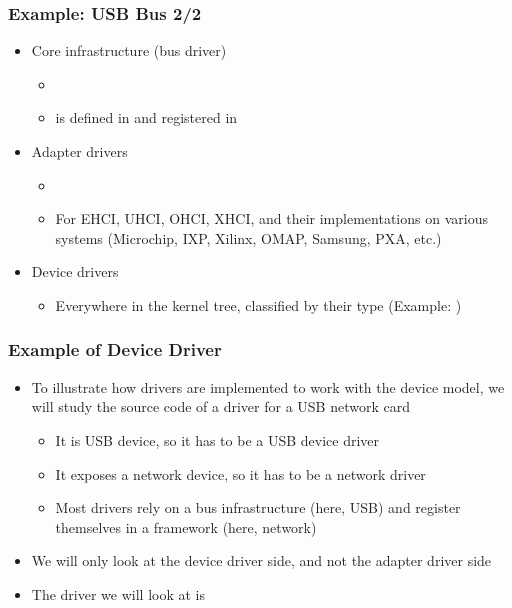 \begin{frame}
  \frametitle{Example: USB Bus 2/2}
  \begin{itemize}
  \item Core infrastructure (bus driver)
    \begin{itemize}
    \item {}
    \item {} is defined in
       and registered in
    \end{itemize}
  \item Adapter drivers
    \begin{itemize}
    \item {}
    \item For EHCI, UHCI, OHCI, XHCI, and their implementations on
      various systems (Microchip, IXP, Xilinx, OMAP, Samsung, PXA, etc.)
    \end{itemize}
  \item Device drivers
    \begin{itemize}
    \item Everywhere in the kernel tree, classified by their type
    (Example: )
    \end{itemize}
  \end{itemize}
\end{frame}

\begin{frame}
  \frametitle{Example of Device Driver}
  \begin{itemize}
  \item To illustrate how drivers are implemented to work with the
    device model, we will study the source code of a driver for a USB
    network card
    \begin{itemize}
    \item It is USB device, so it has to be a USB device driver
    \item It exposes a network device, so it has to be a network driver
    \item Most drivers rely on a bus infrastructure (here, USB) and
      register themselves in a framework (here, network)
    \end{itemize}
  \item We will only look at the device driver side, and not the
    adapter driver side
  \item The driver we will look at is 
  \end{itemize}
\end{frame}

